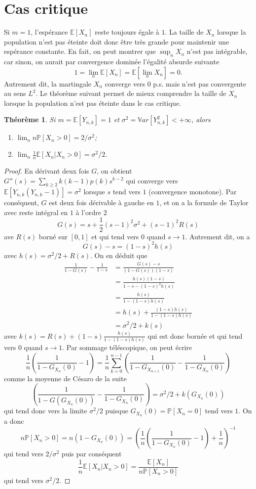 \documentclass[a4paper,12pt]{book}
\newtheorem{thmfr}{Théorème}[section]
\begin{document}
\section{Cas critique}
Si $m=1$, l'espérance $\mathbb{E}[X_n]$ reste toujours égale à $1$. La taille de $X_n$ lorsque la population n'est pas éteinte doit donc être très grande pour maintenir une espérance constante.  En fait, on peut montrer que $\sup_n X_n$ n'est pas intégrable, car sinon, on aurait par convergence dominée l'égalité absurde suivante
$$1=\lim_n\mathbb{E}[X_n]=\mathbb{E}[\lim_n X_n]=0.$$
Autrement dit, la martingale $X_n$ converge vers $0$ p.s. mais n'est pas convergente au sens $L^2$.
Le théorème suivant permet de mieux comprendre la taille de $X_n$ lorsque la population n'est pas éteinte dans le cas critique.
\begin{thmfr}
Si $m=\mathbb{E}[Y_{n,k}]=1$ et $\sigma^2=\mathbb{V}ar[Y_{n,k}^2]<+\infty$, alors
\begin{enumerate}
\item $\lim_n n\mathbb{P}[X_n>0]=2/\sigma^2$;
\item $\lim_n \frac{1}{n}\mathbb{E}[X_n|X_n>0]=\sigma^2/2$.
\end{enumerate}
\end{thmfr}
\begin{proof}
En dérivant deux fois $G$, on obtient $G''(s)=\sum_{k\geq 2}k(k-1)p(k)s^{k-2}$ qui converge vers $\mathbb{E}[Y_{n,k}(Y_{n,k}-1)]=\sigma^2$ lorsque $s$ tend vers $1$ (convergence monotone). Par conséquent, $G$ est deux fois dérivable à gauche en $1$, et on a la formule de Taylor avec reste intégral en $1$ à l'ordre $2$
$$G(s)=s+\frac{1}{2}(s-1)^2\sigma^2+(s-1)^2R(s) $$
ave $R(s)$ borné sur $[0,1]$ et qui tend vers $0$ quand $s\to 1$. Autrement dit, on a
$$G(s)-s= (1-s)^2h(s)$$
avec $h(s)=\sigma^2/2+R(s)$. On en déduit que
\begin{align*}
\frac{1}{1-G(s)}-\frac{1}{1-s}&=\frac{G(s)-s}{(1-G(s))(1-s)}\\
&=\frac{h(s)(1-s)}{1-s-(1-s)^2h(s)}\\
&=\frac{h(s)}{1-(1-s)h(s)}\\
&=h(s)+\frac{(1-s)h(s)}{1-(1-s)h(s)}\\
&=\sigma^2/2+k(s)
\end{align*}
avec $k(s)=R(s)+(1-s)\frac{h(s)}{1-(1-s)h(s)}$ qui est donc bornée et qui tend vers $0$ quand $s\to 1$. Par sommage téléscopique, on peut écrire
$$\frac{1}{n}\left(\frac{1}{1-G_{X_{n}}(0)}-1\right)=\frac{1}{n}\sum_{k=0}^{n-1}\left(\frac{1}{1-G_{X_{n+1}}(0)}-\frac{1}{1-G_{X_n}(0)}\right)$$
comme la moyenne de Césaro de la suite
$$\left(\frac{1}{1-G(G_{X_n}(0))}-\frac{1}{1-G_{X_n}(0)}\right)=\sigma^2/2+k(G_{X_n}(0))$$
qui tend donc vers la limite $\sigma^2/2$ puisque $G_{X_n}(0)=\mathbb{P}[X_n=0]$ tend vers $1$. On a donc $$n\mathbb{P}[X_n>0]=n(1-G_{X_n}(0))=\left(\frac{1}{n}\left(\frac{1}{1-G_{X_{n}}(0)}-1\right)+\frac{1}{n}\right)^{-1}$$ qui tend vers $2/\sigma^2$ puis par conséquent
$$\frac{1}{n}\mathbb{E}[X_n|X_n>0]=\frac{\mathbb{E}[X_n]}{n\mathbb{P}[X_n>0]}$$
qui tend vers $\sigma^2/2$.
\end{proof}
\end{document}
